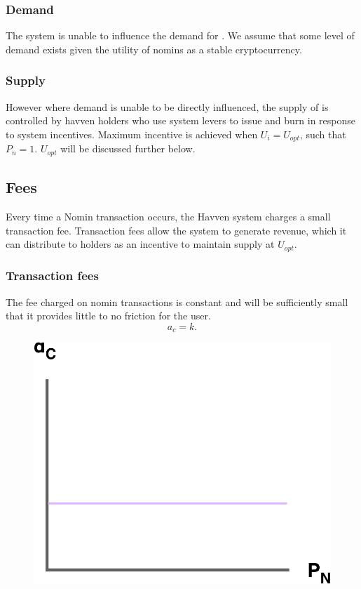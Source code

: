 \subsubsection*{Demand}

\noindent The system is unable to influence the demand for \NOM{}. We assume that some level of demand exists given the utility of nomins as a stable cryptocurrency.

\subsubsection*{Supply}

\noindent However where demand is unable to be directly influenced, the supply of \NOM{} is controlled by havven holders who use system levers to issue and burn \NOM{} in response to system incentives. Maximum incentive is achieved when $U_i = U_{opt}$, such that $P_n = 1$. $U_{opt}$ will be discussed further below. \\

\newpage
\subsection{Fees} Every time a Nomin transaction occurs, the Havven system charges a small transaction fee. Transaction fees allow the system to generate revenue, which it can distribute to \HAV{} holders as an incentive to maintain \NOM{} supply at $U_{opt}$.

\subsubsection{Transaction fees}

\noindent The fee charged on nomin transactions is constant and will be sufficiently small that it provides little to no friction for the user. \\

$$ a_c = k.$$

\begin{figure}[h!]
    \centering
    \includegraphics[width=.55\textwidth]{img/fees-charged}
\end{figure}


